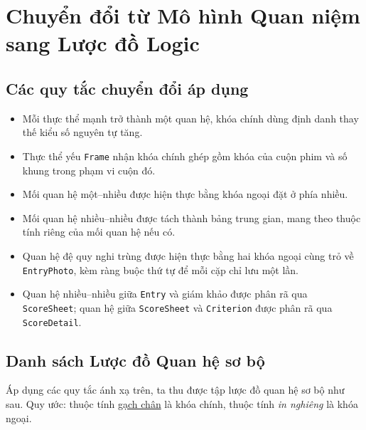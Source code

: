 \section{Chuyển đổi từ Mô hình Quan niệm sang Lược đồ Logic}

\subsection{Các quy tắc chuyển đổi áp dụng}


\begin{itemize}
    \item Mỗi thực thể mạnh trở thành một quan hệ, khóa chính dùng định danh thay thế kiểu số nguyên tự tăng.
    \item Thực thể yếu \texttt{Frame} nhận khóa chính ghép gồm khóa của cuộn phim và số khung trong phạm vi cuộn đó.
    \item Mối quan hệ một--nhiều được hiện thực bằng khóa ngoại đặt ở phía nhiều.
    \item Mối quan hệ nhiều--nhiều được tách thành bảng trung gian, mang theo thuộc tính riêng của mối quan hệ nếu có.
    \item Quan hệ đệ quy nghi trùng được hiện thực bằng hai khóa ngoại cùng trỏ về \texttt{EntryPhoto}, kèm ràng buộc thứ tự để mỗi cặp chỉ lưu một lần.
    \item Quan hệ nhiều--nhiều giữa \texttt{Entry} và giám khảo được phân rã qua \texttt{ScoreSheet}; quan hệ giữa \texttt{ScoreSheet} và \texttt{Criterion} được phân rã qua \texttt{ScoreDetail}.
\end{itemize}


\subsection{Danh sách Lược đồ Quan hệ sơ bộ}

Áp dụng các quy tắc ánh xạ trên, ta thu được tập lược đồ quan hệ sơ bộ như sau. Quy ước: thuộc tính \underline{gạch chân} là khóa chính, thuộc tính \textit{in nghiêng} là khóa ngoại.

